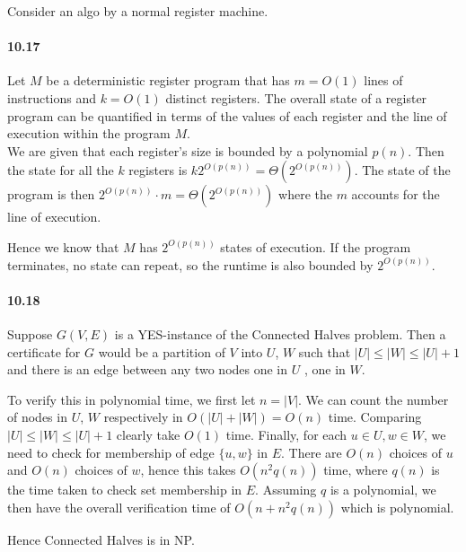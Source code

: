 \documentclass{article}
\begin{document}
Consider an algo by a normal register machine.

\paragraph{10.17}
Let $M$ be a deterministic register program that has $m=O(1)$ lines of instructions and $k=O(1)$ distinct registers. The overall state of a register program can be quantified in terms of the values of each register and the line of execution within the program $M$.\\
We are given that each register's size is bounded by a polynomial $p(n)$. Then the state for all the $k$ registers is $k2^{O(p(n))} = \Theta(2^{O(p(n))})$. The state of the program is then $2^{O(p(n))}\cdot m =\Theta(2^{O(p(n))})$ where the $m$ accounts for the line of execution.

Hence we know that $M$ has $2^{O(p(n))}$ states of execution. If the program terminates, no state can repeat, so the runtime is also bounded by $2^{O(p(n))}$.

\paragraph{10.18}
Suppose $G(V,E)$ is a YES-instance of the Connected Halves problem. Then a certificate for $G$ would be a partition of $V$ into $U$, $W$ such that $|U|\leq |W|\leq |U| + 1$ and there is an edge between any two nodes one in $U$ , one in $W$.

To verify this in polynomial time, we first let $n=|V|$. We can count the number of nodes in $U$, $W$ respectively in $O(|U| + |W|) = O(n)$ time. Comparing $|U|\leq |W|\leq |U|+1$ clearly take $O(1)$ time. Finally, for each $u\in U, w\in W$, we need to check for membership of edge $\{u,w\}$ in $E$. There are $O(n)$ choices of $u$ and $O(n)$ choices of $w$, hence this takes $O(n^2q(n))$ time, where $q(n)$ is the time taken to check set membership in $E$. Assuming $q$ is a polynomial, we then have the overall verification time of $O(n+n^2q(n))$ which is polynomial.

Hence Connected Halves is in NP.
\end{document}
